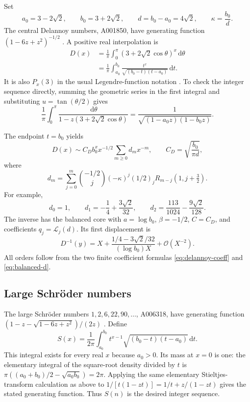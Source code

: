 \documentclass[11pt,a4paper]{article}
\numberwithin{equation}{section}
\theoremstyle{definition}
\theoremstyle{remark}
\newcommand{\dd}{\,\mathrm d}
\newcommand{\cL}{\mathcal L}
\newcommand{\bigO}{\mathcal O}
\newcommand{\rising}[2]{(#1)_{#2}}
\begin{document}
Set
\begin{equation}
 a_0=3-2\sqrt2,\qquad b_0=3+2\sqrt2,\qquad
 d=b_0-a_0=4\sqrt2,\qquad \kappa=\frac{b_0}{d}.
 \label{eq:DS-constants}
\end{equation}
The central Delannoy numbers, A001850, have generating function
$(1-6z+z^2)^{-1/2}$ \cite{oeisdelannoy}. A positive real interpolation is
\begin{align}
 D(x)&=\frac1\pi\int_0^\pi(3+2\sqrt2\cos\theta)^x\dd\theta\nonumber\\
 &=\frac1\pi\int_{a_0}^{b_0}
           \frac{t^x}{\sqrt{(b_0-t)(t-a_0)}}\dd t.
 \label{eq:delannoy-moment}
\end{align}
It is also $P_x(3)$ in the usual Legendre-function notation \cite{dlmflegendre}. To check the integer sequence directly, summing the geometric series in the first integral and substituting $u=\tan(\theta/2)$ gives
\[
 \frac1\pi\int_0^\pi\frac{\dd\theta}{1-z(3+2\sqrt2\cos\theta)}
 =\frac1{\sqrt{(1-a_0z)(1-b_0z)}}.
\]

The endpoint $t=b_0$ yields
\begin{equation}
 D(x)\sim C_D b_0^x x^{-1/2}\sum_{m\ge0}d_mx^{-m},
 \qquad C_D=\sqrt{\frac{b_0}{\pi d}},
 \label{eq:delannoy-asymp}
\end{equation}
where
\begin{equation}
 d_m=\sum_{j=0}^m\binom{-1/2}{j}(-\kappa)^j
             \rising{1/2}{j}R_{m-j}(1,j+\tfrac32).
 \label{eq:delannoy-coeff}
\end{equation}
For example,
\[
 d_0=1,\qquad d_1=-\frac14+\frac{3\sqrt2}{32},\qquad
 d_2=\frac{113}{1024}-\frac{9\sqrt2}{128}.
\]
The inverse has the balanced core with $a=\log b_0$, $\beta=-1/2$, $C=C_D$, and coefficients $q_j=\cL_j(d)$. Its first displacement is
\[
 D^{-1}(y)=X+\frac{1/4-3\sqrt2/32}{(\log b_0)X}+\bigO(X^{-2}).
\]
All orders follow from the two finite coefficient formulas \eqref{eq:delannoy-coeff} and \eqref{eq:balanced-d}.

\subsection{Large Schr\"oder numbers}

The large Schr\"oder numbers $1,2,6,22,90,\ldots$, A006318, have generating function
$(1-z-\sqrt{1-6z+z^2})/(2z)$ \cite{oeisschroder}. Define
\begin{equation}
 S(x)=\frac1{2\pi}\int_{a_0}^{b_0}
                t^{x-1}\sqrt{(b_0-t)(t-a_0)}\dd t.
 \label{eq:schroder-moment}
\end{equation}
This integral exists for every real $x$ because $a_0>0$. Its mass at $x=0$ is one: the elementary integral of the square-root density divided by $t$ is
$\pi((a_0+b_0)/2-\sqrt{a_0b_0})=2\pi$. Applying the same elementary Stieltjes-transform calculation as above to
$1/[t(1-zt)]=1/t+z/(1-zt)$ gives the stated generating function. Thus $S(n)$ is the desired integer sequence.
\end{document}
